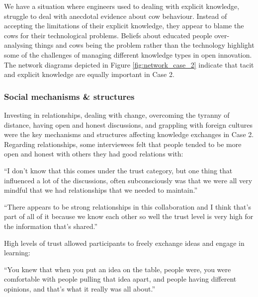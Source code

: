 We have a situation where engineers used to dealing with explicit knowledge, struggle to deal with anecdotal evidence about cow behaviour. Instead of accepting the limitations of their explicit knowledge, they appear to blame the cows for their technological problems. Beliefs about educated people over-analysing things and cows being the problem rather than the technology highlight some of the challenges of managing different knowledge types in open innovation. The network diagrams depicted in Figure \ref{fig:network_case_2} indicate that tacit and explicit knowledge are equally important in Case 2. 

\subsubsection{Social mechanisms \& structures}

Investing in relationships, dealing with change, overcoming the tyranny of distance, having open and honest discussions, and grappling with foreign cultures were the key mechanisms and structures affecting knowledge exchanges in Case 2. Regarding relationships, some interviewees felt that people tended to be more open and honest with others they had good relations with:

\begin{displayquote}[Participant 8/2]
\small
\enquote{I don't know that this comes under the trust category, but one thing that influenced a lot of the discussions, often subconsciously was that we were all very mindful that we had relationships that we needed to maintain.} 
\end{displayquote}


\begin{displayquote}[Participant 11/2]
\small
\enquote{There appears to be strong relationships in this collaboration and I think that's part of all of it because we know each other so well the trust level is very high for the information that's shared.} 
\end{displayquote}


High levels of trust allowed participants to freely exchange ideas and engage in learning: 

\begin{displayquote}[Participant 8/2]
\small
\enquote{You knew that when you put an idea on the table, people were, you were comfortable with people pulling that idea apart, and people having different opinions, and that’s what it really was all about.} 
\end{displayquote}


